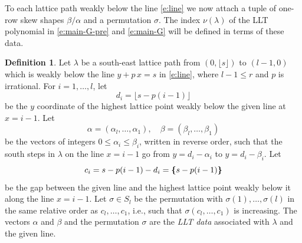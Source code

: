 \documentclass[12pt]{amsart}
\theoremstyle{definition}
\newtheorem{defn}[thm]{Definition}
\theoremstyle{remark}
\newcommand{\fp}[1]{{\boldsymbol \{} #1 {\boldsymbol \}}}
\begin{document}
\begin{figure}
\caption{\label{fig:balanced-hook}}
\end{figure}

To each lattice path weakly below the line \eqref{e:line} we now attach a
tuple of one-row skew shapes $\beta /\alpha $ and a permutation
$\sigma $.  The index $\nu (\lambda )$ of the LLT polynomial in
\eqref{e:main-G-pre} and \eqref{e:main-G} will be defined in terms of
these data.

\begin{defn}\label{def:LLT-data}
Let $\lambda $ be a south-east lattice path from $(0,\lfloor s
\rfloor)$ to $(l-1,0)$ which is weakly below the line $y+p\, x = s$ in
\eqref{e:line}, where $l-1\leq r$ and $p$ is irrational.  For $i =
1,\ldots,l$, let
\begin{equation}\label{e:top-points}
d_{i} = \lfloor s-p(i-1) \rfloor
\end{equation}
be the $y$ coordinate of the highest lattice point weakly below the
given line at $x=i-1$.  Let
\begin{equation}\label{e:alpha-beta}
\alpha = (\alpha _{l},\ldots,\alpha _{1}),\quad \beta = (\beta
_{l},\ldots,\beta _{1})
\end{equation}
be the vectors of integers $0\leq \alpha _{i}\leq \beta _{i}$, written
in reverse order, such that the south steps in $\lambda $ on the line
$x = i-1$ go from $y = d_{i}-\alpha _{i}$ to $y = d_{i}-\beta _{i}$.
Let
\begin{equation}\label{e:gaps}
c_{i}  = s-p(i-1)-d_{i} = \fp{ s-p(i-1) }
\end{equation}
be the gap between the given line and the highest lattice point weakly
below it along the line $x = i-1$.
Let $\sigma \in S_{l}$ be the permutation with $\sigma
(1),\ldots,\sigma (l)$ in the same relative order as
$c_{l},\ldots,c_{1}$, i.e., such that $\sigma (c_{l},\ldots,c_{1})$ is
increasing.  The vectors $\alpha $ and $\beta $ and the permutation
$\sigma $ are the {\em LLT data} associated with $\lambda $ and the
given line.
\end{defn}
\end{document}
